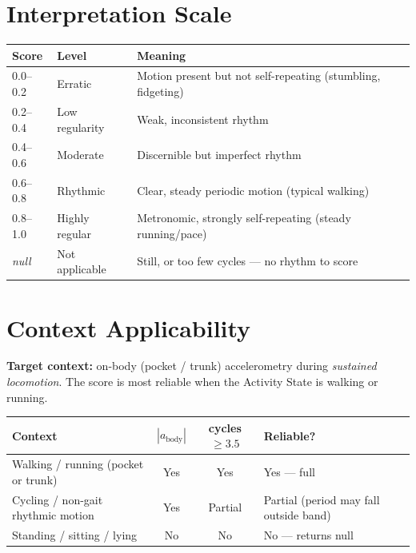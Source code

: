 \section{Interpretation Scale}

\begin{center}
\begin{tabular}{@{}lll@{}}
\toprule
\textbf{Score} & \textbf{Level} & \textbf{Meaning} \\
\midrule
0.0--0.2 & Erratic          & Motion present but not self-repeating (stumbling, fidgeting) \\
0.2--0.4 & Low regularity   & Weak, inconsistent rhythm \\
0.4--0.6 & Moderate         & Discernible but imperfect rhythm \\
0.6--0.8 & Rhythmic         & Clear, steady periodic motion (typical walking) \\
0.8--1.0 & Highly regular   & Metronomic, strongly self-repeating (steady running/pace) \\
\midrule
\textit{null} & Not applicable & Still, or too few cycles --- no rhythm to score \\
\bottomrule
\end{tabular}
\end{center}

\section{Context Applicability}

\begin{callout}
\textbf{Target context:} on-body (pocket / trunk) accelerometry during \emph{sustained
locomotion}. The score is most reliable when the Activity State is walking or running.
\end{callout}

\begin{center}
\begin{tabular}{@{}>{\raggedright\arraybackslash}p{5.6cm} c c >{\raggedright\arraybackslash}p{3.6cm}@{}}
\toprule
\textbf{Context} & \textbf{$|a_\text{body}|$} & \textbf{cycles $\geq 3.5$} & \textbf{Reliable?} \\
\midrule
Walking / running (pocket or trunk) & Yes & Yes & Yes --- full \\
Cycling / non-gait rhythmic motion  & Yes & Partial & Partial (period may fall outside band) \\
Standing / sitting / lying          & No  & No  & No --- returns null \\
\bottomrule
\end{tabular}
\end{center}

